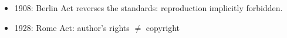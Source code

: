 \documentclass[10pt,compress,serif,aspectratio=169]{beamer}
\begin{document}
\begin{frame}[t]
\begin{itemize}
 \item 1908: Berlin Act reverses the standards: reproduction implicitly forbidden. %
 \item 1928: Rome Act: author’s rights $\neq$ copyright
 \end{itemize}
\end{frame}

\end{document}
